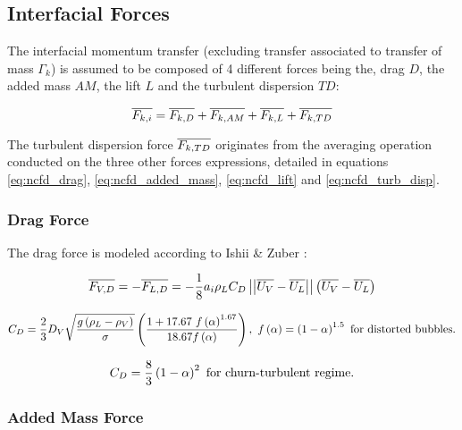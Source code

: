 \subsection{Interfacial Forces}
\label{subsec:ncfd_interf_qdm}

The interfacial momentum transfer (excluding transfer associated to transfer of mass $\Gamma_{k}$) is assumed to be composed of 4 different forces being the, drag $D$, the added mass $AM$, the lift $L$ and the turbulent dispersion $TD$:

\begin{equation}
\overline{F_{k,i}}=\overline{F_{k,D}} + \overline{F_{k,AM}} +\overline{F_{k,L}} +\overline{F_{k,TD}}
\label{eq:ncfd_force_balance}
\end{equation}

\npar

The turbulent dispersion force $\overline{F_{k,TD}}$ originates from the averaging operation conducted on the three other forces expressions, detailed in equations \ref{eq:ncfd_drag}, \ref{eq:ncfd_added_mass}, \ref{eq:ncfd_lift} and \ref{eq:ncfd_turb_disp}.

\subsubsection{Drag Force}

The drag force is modeled according to Ishii \& Zuber \cite{ishii_drag_1979}:

\begin{equation}
\overline{F_{V,D}}=-\overline{F_{L,D}}=-\frac{1}{8}a_{i}\rho_{L}C_{D}\left|\left|{ \overline{U_{V}}-\overline{U_{L}} }\right|\right|\left( \overline{U_{V}}-\overline{U_{L}}  \right)
\label{eq:ncfd_drag}
\end{equation}

\begin{equation}
C_{D} = \frac{2}{3}D_{V}\sqrt{\dfrac{g\parth{\rho_{L}-\rho_{V}}}{\sigma}}\parth{ \frac{1 + 17.67~f\parth{\alpha}^{1.67}}{18.67f\parth{\alpha}} }, \ f\parth{\alpha} = \parth{1-\alpha}^{1.5}\ \text{for distorted bubbles.}
\end{equation}

\begin{equation}
C_{D} = \frac{8}{3} \left( 1-\alpha \right)^{2}\ \text{for churn-turbulent regime.}
\end{equation}

\subsubsection{Added Mass Force}

